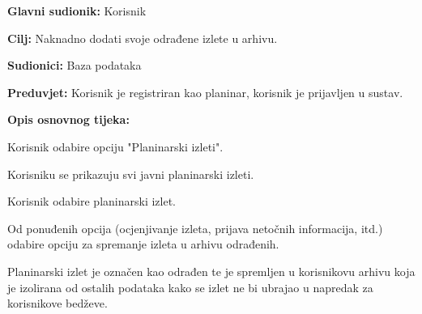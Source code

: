 		
		
		\noindent {}
		\begin{packed_item}
			
			\item \textbf{Glavni sudionik: } Korisnik 
			\item  \textbf{Cilj:} Naknadno dodati svoje odrađene izlete u arhivu.
			\item  \textbf{Sudionici:} Baza podataka
			\item  \textbf{Preduvjet:} Korisnik je registriran kao planinar, korisnik je prijavljen u sustav.
			\item  \textbf{Opis osnovnog tijeka:}
			
			\item[] \begin{packed_enum}
				
				\item Korisnik odabire opciju "Planinarski izleti".
				\item Korisniku se prikazuju svi javni planinarski izleti.
				\item Korisnik odabire planinarski izlet.
				\item Od ponuđenih opcija (ocjenjivanje izleta, prijava netočnih informacija, itd.) odabire opciju za spremanje izleta u arhivu odrađenih.
				\item Planinarski izlet je označen kao odrađen te je spremljen u korisnikovu arhivu koja je izolirana od ostalih podataka kako se izlet ne bi ubrajao u napredak za korisnikove bedževe.
				
			\end{packed_enum}
		\end{packed_item}
		
		
		

